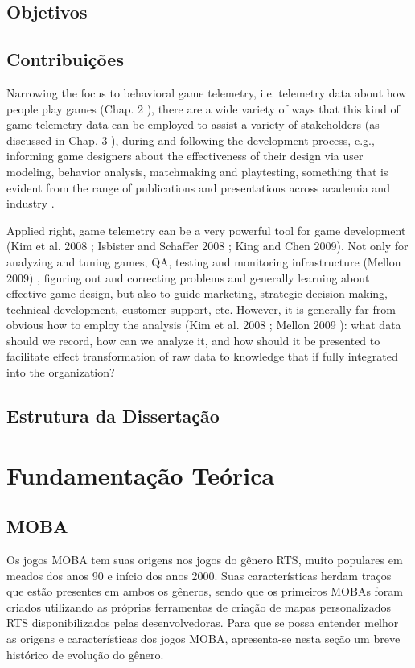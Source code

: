 \section{Objetivos}
\section{Contribuições}

Narrowing the focus to behavioral game telemetry, i.e. telemetry data about how people play games (Chap. 2 ), there are a wide variety of ways that this kind of game telemetry data can be employed to assist a variety of stakeholders (as discussed in Chap. 3 ), during and following the development process, e.g., informing game designers about the effectiveness of their design via user modeling, behavior analysis, matchmaking and playtesting, something that is evident from the range of publications and presentations across academia and industry \cite{el2016game}.


Applied right, game telemetry can be a very powerful tool for game development (Kim et al. 2008 ; Isbister and Schaffer 2008 ; King and Chen 2009). Not only for analyzing and tuning games, QA, testing and monitoring infrastructure (Mellon 2009) , figuring out and correcting problems and generally learning about effective game design, but also to guide marketing, strategic decision making, technical development, customer support, etc. However, it is generally far from obvious how to employ the analysis (Kim et al. 2008 ; Mellon 2009 ): what data should we record, how can we analyze it, and how should it be presented to facilitate effect transformation of raw data to knowledge that if fully integrated into the organization?


\section{Estrutura da Dissertação}

\chapter{Fundamentação Teórica}

\section{MOBA}
Os jogos MOBA tem suas origens nos jogos do gênero RTS, muito populares em meados dos anos 90 e início dos anos 2000. Suas características herdam traços que estão presentes em ambos os gêneros, sendo que os primeiros MOBAs foram criados utilizando as próprias ferramentas de criação de mapas personalizados RTS disponibilizados pelas desenvolvedoras. Para que se possa entender melhor as origens e características dos jogos MOBA, apresenta-se nesta seção um breve histórico de evolução do gênero.

